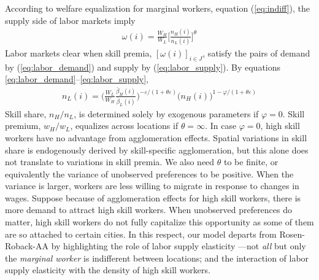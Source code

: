 \documentclass{article}
\begin{document}
According to welfare equalization for marginal workers, equation (\ref{eq:indiff}), the supply side of labor markets imply
\begin{eqnarray}\label{eq:labor_supply}
	\omega(i) = \frac{W_H}{W_L} \Big[ \frac{n_H(i)}{n_L(i)} \Big]^{\theta}
\end{eqnarray}
Labor markets clear when skill premia, $[\omega(i)]_{i \in J}$, satisfy the pairs of demand by (\ref{eq:labor_demand}) and supply by (\ref{eq:labor_supply}). By equations \ref{eq:labor_demand}--\ref{eq:labor_supply},
\begin{eqnarray}\label{eq:labor_demand_supply}
n_L(i) = \Big( \frac{W_L}{W_H} \frac{\bar{\beta}_H(i)}{\bar{\beta}_L(i)} \Big)^{-\varepsilon/(1+\theta \varepsilon)} \Big( n_H(i) \Big)^{1-\varphi/(1+\theta \varepsilon)}
\end{eqnarray}
Skill share, $n_H/n_L$, is determined solely by exogenous parameters if $\varphi=0$. Skill premium, $w_H/w_L$, equalizes across locations if $\theta=\infty$. In case $\varphi=0$, high skill workers have no advantage from agglomeration effects. Spatial variations in skill share is endogenously derived by skill-specific agglomeration, but this alone does not translate to variations in skill premia. We also need $\theta$ to be finite, or equivalently the variance of unobserved preferences to be positive. When the variance is larger, workers are less willing to migrate in response to changes in wages.
Suppose because of agglomeration effects for high skill workers, there is more demand to attract high skill workers. When unobserved preferences do matter, high skill workers do not fully capitalize this opportunity as some of them are so attached to certain cities. In this respect, our model departs from Rosen-Roback-AA by highlighting the role of labor supply elasticity ---not \textit{all} but only the \textit{marginal worker} is indifferent between locations; and the interaction of labor supply elasticity with the density of high skill workers.
\end{document}
